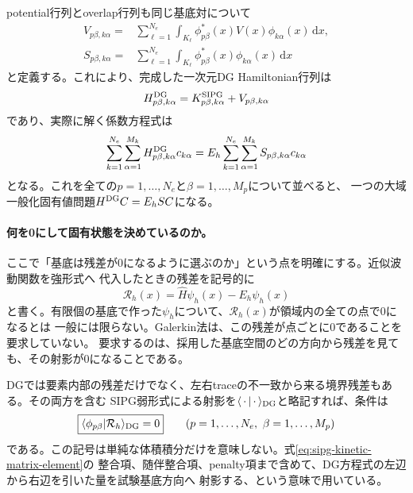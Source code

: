 \documentclass[11pt,a4paper]{article}
\newcommand{\dd}{\mathrm d}
\begin{document}
potential行列とoverlap行列も同じ基底対について
\begin{align}
 V_{p\beta,k\alpha}
 =&\sum_{\ell=1}^{N_e}\int_{K_\ell}
 \phi_{p\beta}^*(x)V(x)\phi_{k\alpha}(x)\,\dd x,\\
 S_{p\beta,k\alpha}
 =&\sum_{\ell=1}^{N_e}\int_{K_\ell}
 \phi_{p\beta}^*(x)\phi_{k\alpha}(x)\,\dd x
 \label{eq:1d-potential-overlap-matrices}
\end{align}
と定義する。これにより、完成した一次元DG Hamiltonian行列は
\begin{equation}
 H^{\rm DG}_{p\beta,k\alpha}=K^{\rm SIPG}_{p\beta,k\alpha}+V_{p\beta,k\alpha}
 \label{eq:1d-dg-hamiltonian-matrix}
\end{equation}
であり、実際に解く係数方程式は
\begin{equation}
 \sum_{k=1}^{N_e}\sum_{\alpha=1}^{M_k}
 H^{\rm DG}_{p\beta,k\alpha}c_{k\alpha}
 =E_h\sum_{k=1}^{N_e}\sum_{\alpha=1}^{M_k}
 S_{p\beta,k\alpha}c_{k\alpha}
 \label{eq:1d-dg-generalized-eigenproblem}
\end{equation}
となる。これを全ての$p=1,\ldots,N_e$と$\beta=1,\ldots,M_p$について並べると、
一つの大域一般化固有値問題$H^{\rm DG}C=E_hSC$になる。

\paragraph{何を0にして固有状態を決めているのか。}
ここで「基底は残差が0になるように選ぶのか」という点を明確にする。近似波動関数を強形式へ
代入したときの残差を記号的に
\begin{equation}
 \mathcal R_h(x)=\hat H\psi_h(x)-E_h\psi_h(x)
 \label{eq:pointwise-dg-residual}
\end{equation}
と書く。有限個の基底で作った$\psi_h$について、$\mathcal R_h(x)$が領域内の全ての点で0になるとは
一般には限らない。Galerkin法は、この残差が点ごとに0であることを要求していない。
要求するのは、採用した基底空間のどの方向から残差を見ても、その射影が0になることである。

DGでは要素内部の残差だけでなく、左右traceの不一致から来る境界残差もある。その両方を含む
SIPG弱形式による射影を$\langle\,\cdot\,|\,\cdot\,\rangle_{\rm DG}$と略記すれば、条件は
\begin{equation}
 \boxed{\langle\phi_{p\beta}|\mathcal R_h\rangle_{\rm DG}=0}
 \qquad
 (p=1,\ldots,N_e,\ \beta=1,\ldots,M_p)
 \label{eq:projected-dg-residual-zero}
\end{equation}
である。この記号は単純な体積積分だけを意味しない。式\eqref{eq:sipg-kinetic-matrix-element}の
整合項、随伴整合項、penalty項まで含めて、DG方程式の左辺から右辺を引いた量を試験基底方向へ
射影する、という意味で用いている。
\end{document}

